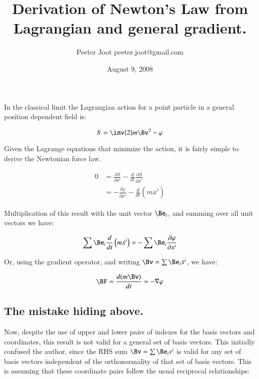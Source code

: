 \documentclass{article}
\title{ Derivation of Newton's Law from Lagrangian and general gradient.}
\author{Peeter Joot \quad peeter.joot@gmail.com}
\date{August 9, 2008}
\newcommand{\grad}[0]{\nabla}
\newcommand{\PD}[2]{ \frac{\partial{#1}}{\partial {#2}} }
\begin{document}
\maketitle{}

\section{}

In the classical limit the Lagrangian action for a point particle in a general
position dependent field is:

\begin{equation}
S = \inv{2} m\Bv^2 - \varphi
\end{equation}

Given the Lagrange equations that minimize the action, it is fairly simple
to derive the Newtonian force law.

\begin{align*}
0
&= \PD{S}{x^i} - \frac{d}{dt}\PD{S}{\dot{x}^i} \\
&= -\PD{\varphi}{x^i} - \frac{d}{dt}\left(m \dot{x}^i\right)
\end{align*}

Multiplication of this result with the unit vector $\Be_i$, and summing over
all unit vectors we have:

\begin{equation*}
\sum \Be_i \frac{d}{dt}\left(m \dot{x}^i\right) = - \sum \Be_i \PD{\varphi}{x^i}
\end{equation*}

Or, using the gradient operator, and writing $\Bv = \sum \Be_i \dot{x}^i$, we have:

\begin{equation}
\BF = \frac{d (m \Bv)}{dt} = - \grad \varphi
\end{equation}

\subsection{ The mistake hiding above. }

Now, despite the use of upper and lower pairs of indexes for the basis vectors and coordinates, this
result is not valid for a general set of basis vectors.  This initially confused the author, since the RHS
sum $\Bv = \sum \Be_i v^i$ is valid for any set of basis vectors independent of the orthonormality of that
set of basis vectors.  This is assuming that these coordinate pairs follow the usual reciprocal relationships:
\end{document}
